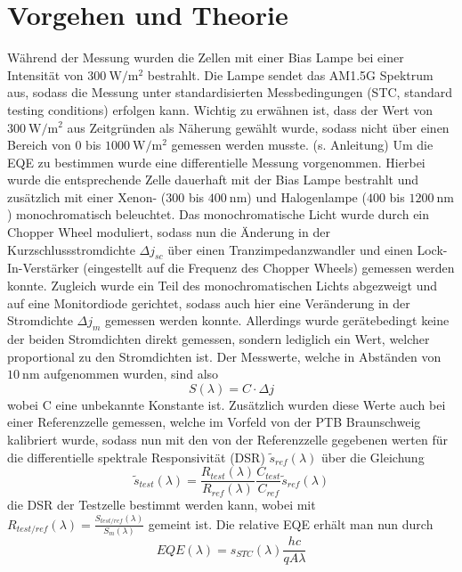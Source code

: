 \documentclass[ngerman, twocolumn]{scrartcl}
\begin{document}
\section{Vorgehen und Theorie}
Während der Messung wurden die Zellen mit einer Bias Lampe bei einer Intensität von $\SI{300}{\watt\per\square\meter}$ bestrahlt. Die Lampe sendet das AM1.5G Spektrum aus, sodass die Messung unter standardisierten Messbedingungen (STC, standard testing conditions) erfolgen kann. Wichtig zu erwähnen ist, dass der Wert von $\SI{300}{\watt\per\square\meter}$ aus Zeitgründen als Näherung gewählt wurde, sodass nicht über einen Bereich von $0$ bis $\SI{1000}{\watt\per\square\meter}$ gemessen werden musste. (s. Anleitung)
Um die EQE zu bestimmen wurde eine differentielle Messung vorgenommen. Hierbei wurde die entsprechende Zelle dauerhaft mit der Bias Lampe bestrahlt und zusätzlich mit einer Xenon- ($300$ bis $\SI{400}{\nano\meter}$) und Halogenlampe ($400$ bis $\SI{1200}{\nano\meter}$) monochromatisch beleuchtet. Das monochromatische Licht wurde durch ein Chopper Wheel moduliert, sodass nun die Änderung in der Kurzschlussstromdichte $\Delta j_{sc}$ über einen Tranzimpedanzwandler und einen Lock-In-Verstärker (eingestellt auf die Frequenz des Chopper Wheels) gemessen werden konnte. Zugleich wurde ein Teil des monochromatischen Lichts abgezweigt und auf eine Monitordiode gerichtet, sodass auch hier eine Veränderung in der Stromdichte $\Delta j_m$ gemessen werden konnte. Allerdings wurde gerätebedingt keine der beiden Stromdichten direkt gemessen, sondern lediglich ein Wert, welcher proportional zu den Stromdichten ist. Der Messwerte, welche in Abständen von $\SI{10}{\nano\meter}$ aufgenommen wurden, sind also
\begin{equation}
S(\lambda) = C \cdot \Delta j
\end{equation}
wobei C eine unbekannte Konstante ist. Zusätzlich wurden diese Werte auch bei einer Referenzzelle gemessen, welche im Vorfeld von der PTB Braunschweig kalibriert wurde, sodass nun mit den von der Referenzzelle gegebenen werten für die differentielle spektrale Responsivität (DSR) $\tilde{s}_{ref}(\lambda)$ über die Gleichung
\begin{equation}
\tilde{s}_{test}(\lambda) = \frac{R_{test}(\lambda)}{R_{ref}(\lambda)}\frac{C_{test}}{C_{ref}} \tilde{s}_{ref}(\lambda)
\end{equation}
die DSR der Testzelle bestimmt werden kann, wobei mit $R_{test/ref}(\lambda) = \frac{S_{test/ref}(\lambda)}{S_{m}(\lambda)}$ gemeint ist. Die relative EQE erhält man nun durch
\begin{equation}
EQE(\lambda) = s_{STC}(\lambda)\frac{hc}{qA\lambda}
\end{equation}
\end{document}
